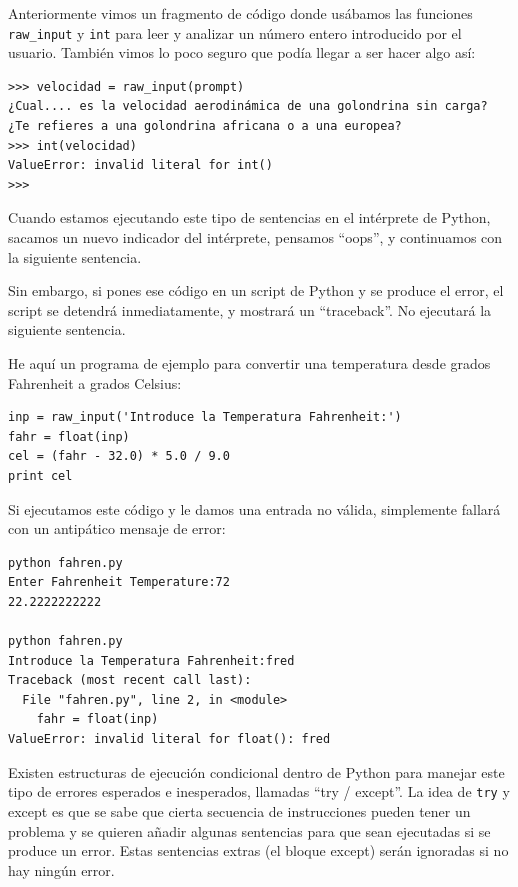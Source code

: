 Anteriormente vimos un fragmento de código donde usábamos las funciones \verb"raw_input" y
{\tt int} para leer y analizar un número entero introducido por
el usuario. También vimos lo poco seguro que podía llegar a ser hacer algo así:

\beforeverb
\begin{verbatim}
>>> velocidad = raw_input(prompt)
¿Cual.... es la velocidad aerodinámica de una golondrina sin carga?
¿Te refieres a una golondrina africana o a una europea?
>>> int(velocidad)
ValueError: invalid literal for int()
>>>
\end{verbatim}
\afterverb
%
Cuando estamos ejecutando este tipo de sentencias en el intérprete de Python,
sacamos un nuevo indicador del intérprete, pensamos ``oops'', y continuamos
con la siguiente sentencia.

Sin embargo, si pones ese código en un
script de Python y se produce el error, el script se detendrá
inmediatamente, y mostrará un ``traceback''.
No ejecutará la siguiente sentencia.


He aquí un programa de ejemplo para convertir una temperatura
desde grados Fahrenheit a grados Celsius:


\beforeverb
\begin{verbatim}
inp = raw_input('Introduce la Temperatura Fahrenheit:')
fahr = float(inp)
cel = (fahr - 32.0) * 5.0 / 9.0
print cel
\end{verbatim}
\afterverb
%
Si ejecutamos este código y le damos una entrada no válida, simplemente
fallará con un antipático mensaje de error:

\beforeverb
\begin{verbatim}
python fahren.py 
Enter Fahrenheit Temperature:72
22.2222222222

python fahren.py 
Introduce la Temperatura Fahrenheit:fred
Traceback (most recent call last):
  File "fahren.py", line 2, in <module>
    fahr = float(inp)
ValueError: invalid literal for float(): fred
\end{verbatim}
\afterverb
%
Existen estructuras de ejecución condicional dentro de
Python para manejar este tipo de errores esperados e
inesperados, llamadas ``try / except''. La idea de {\tt try}
y {\\ except} es que se sabe que cierta secuencia
de instrucciones pueden tener un problema y se quieren
añadir algunas sentencias para que sean ejecutadas si se produce un error.
Estas sentencias extras (el bloque except) serán ignoradas
si no hay ningún error.


